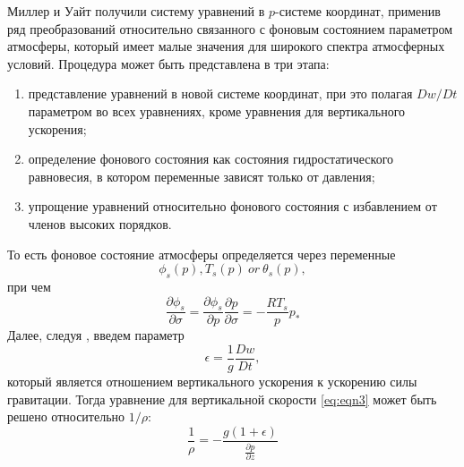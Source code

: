 Миллер и Уайт \citep{MillerWhite1984} получили систему уравнений в $p$-системе координат, применив ряд преобразований относительно связанного с фоновым состоянием параметром атмосферы, который имеет малые значения для широкого спектра атмосферных условий. Процедура может быть представлена в три этапа: \\
\begin{enumerate}
\item представление уравнений в новой системе координат, при это полагая $Dw/Dt$ параметром во всех уравнениях, кроме уравнения для вертикального ускорения;
\item определение фонового состояния как состояния гидростатического равновесия, в котором переменные зависят только от давления;
\item упрощение уравнений относительно фонового состояния с избавлением от членов высоких порядков.
\end{enumerate}

То есть фоновое состояние атмосферы определяется через переменные $$\phi_s(p), T_s(p)~or~\theta_s(p),$$
при чем
\begin{equation}
\frac{\partial\phi_s}{\partial\sigma}=\frac{\partial\phi_s}{\partial p}\frac{\partial p}{\partial\sigma}=-\frac{RT_s}{p}p_*
\end{equation}
Далее, следуя \citep{MillerWhite1984}, введем параметр
\begin{equation}
\epsilon=\frac{1}{g}\frac{Dw}{Dt},
\end{equation}
который является отношением вертикального ускорения к ускорению силы гравитации. Тогда уравнение для вертикальной скорости \eqref{eq:eqn3} может быть решено относительно $1/\rho$:
\begin{equation}
\frac{1}{\rho}=-\frac{g(1+\epsilon)}{\frac{\partial p}{\partial z}} \label{eq:vol}
\end{equation}

